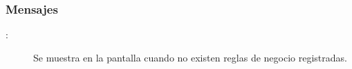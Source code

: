 \subsubsection{Mensajes}

	
\begin{description}
	\item[:] Se muestra en la pantalla  cuando no existen reglas de negocio registradas.
\end{description}
